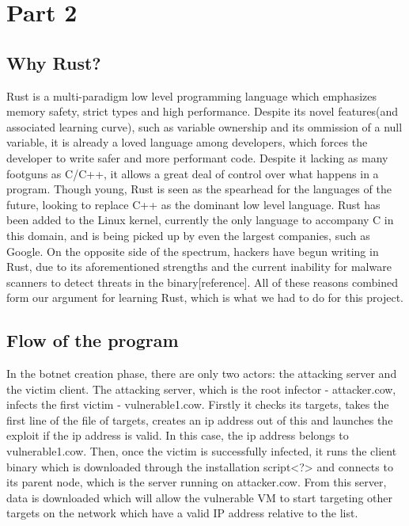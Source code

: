 \documentclass[../main.tex]{subfiles}
\begin{document}
	\chapter{Part 2}


	\section{Why Rust?}


Rust is a multi-paradigm low level programming language which emphasizes memory safety, strict types and high performance. Despite its novel features(and associated learning curve),
such as variable ownership and its ommission of a null variable, it is already a loved language among developers, which forces the developer to write safer and more performant code.
Despite it lacking as many footguns as C/C++, it allows a great deal of control over what happens in a program. Though young, Rust is seen as the spearhead for the languages of the 
future, looking to replace C++ as the dominant low level language. Rust has been added to the Linux kernel, currently the only language to accompany C in this domain, and is being 
picked up by even the largest companies, such as Google. On the opposite side of the spectrum, hackers have begun writing in Rust, due to its aforementioned strengths and the 
current inability for malware scanners to detect threats in the binary[reference]. All of these reasons combined form our argument for learning Rust, which is what we had to do for
this project.

	\vspace{10pt}

	\section{Flow of the program}
In the botnet creation phase, there are only two actors: the attacking server and the victim client. The attacking server, which is the root infector - attacker.cow, infects the first
victim - vulnerable1.cow. Firstly it checks its targets, takes the first line of the file of targets, creates an ip address out of this and launches the exploit if the ip address is
valid. In this case, the ip address belongs to vulnerable1.cow. Then, once the victim is successfully infected, it runs the client binary which is downloaded through the installation
script<?> and connects to its parent node, which is the server running on attacker.cow. From this server, data is downloaded which will allow the vulnerable VM to start targeting other targets on the network which have a valid IP address relative to the list.
\end{document}
